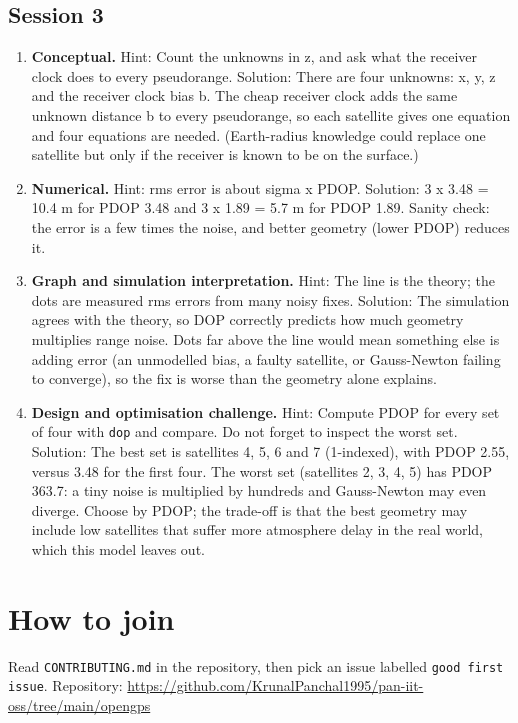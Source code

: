 \documentclass[11pt,a4paper]{article}
\begin{document}
\subsection*{Session 3}
\begin{enumerate}[nosep]
\item \textbf{Conceptual.} Hint: Count the unknowns in z, and ask what the receiver clock does to every pseudorange. Solution: There are four unknowns: x, y, z and the receiver clock bias b. The cheap receiver clock adds the same unknown distance b to every pseudorange, so each satellite gives one equation and four equations are needed. (Earth-radius knowledge could replace one satellite but only if the receiver is known to be on the surface.)
\item \textbf{Numerical.} Hint: rms error is about sigma x PDOP. Solution: 3 x 3.48 = 10.4 m for PDOP 3.48 and 3 x 1.89 = 5.7 m for PDOP 1.89. Sanity check: the error is a few times the noise, and better geometry (lower PDOP) reduces it.
\item \textbf{Graph and simulation interpretation.} Hint: The line is the theory; the dots are measured rms errors from many noisy fixes. Solution: The simulation agrees with the theory, so DOP correctly predicts how much geometry multiplies range noise. Dots far above the line would mean something else is adding error (an unmodelled bias, a faulty satellite, or Gauss-Newton failing to converge), so the fix is worse than the geometry alone explains.
\item \textbf{Design and optimisation challenge.} Hint: Compute PDOP for every set of four with \texttt{dop} and compare. Do not forget to inspect the worst set. Solution: The best set is satellites 4, 5, 6 and 7 (1-indexed), with PDOP 2.55, versus 3.48 for the first four. The worst set (satellites 2, 3, 4, 5) has PDOP 363.7: a tiny noise is multiplied by hundreds and Gauss-Newton may even diverge. Choose by PDOP; the trade-off is that the best geometry may include low satellites that suffer more atmosphere delay in the real world, which this model leaves out.
\end{enumerate}

\section{How to join}
Read \texttt{CONTRIBUTING.md} in the repository, then pick an issue labelled \texttt{good first issue}. Repository: \url{https://github.com/KrunalPanchal1995/pan-iit-oss/tree/main/opengps}
\end{document}
